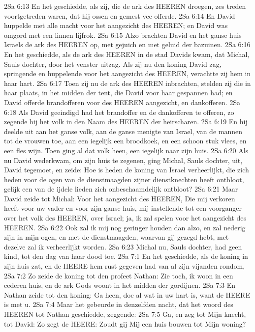 2Sa 6:13  En het geschiedde, als zij, die de ark des HEEREN droegen, zes treden voortgetreden waren, dat hij ossen en gemest vee offerde.
2Sa 6:14  En David huppelde met alle macht voor het aangezicht des HEEREN; en David was omgord met een linnen lijfrok.
2Sa 6:15  Alzo brachten David en het ganse huis Israels de ark des HEEREN op, met gejuich en met geluid der bazuinen.
2Sa 6:16  En het geschiedde, als de ark des HEEREN in de stad Davids kwam, dat Michal, Sauls dochter, door het venster uitzag. Als zij nu den koning David zag, springende en huppelende voor het aangezicht des HEEREN, verachtte zij hem in haar hart.
2Sa 6:17  Toen zij nu de ark des HEEREN inbrachten, stelden zij die in haar plaats, in het midden der tent, die David voor haar gespannen had; en David offerde brandofferen voor des HEEREN aangezicht, en dankofferen.
2Sa 6:18  Als David geeindigd had het brandoffer en de dankofferen te offeren, zo zegende hij het volk in den Naam des HEEREN der heirscharen.
2Sa 6:19  En hij deelde uit aan het ganse volk, aan de ganse menigte van Israel, van de mannen tot de vrouwen toe, aan een iegelijk een broodkoek, en een schoon stuk vlees, en een fles wijn. Toen ging al dat volk heen, een iegelijk naar zijn huis.
2Sa 6:20  Als nu David wederkwam, om zijn huis te zegenen, ging Michal, Sauls dochter, uit, David tegemoet, en zeide: Hoe is heden de koning van Israel verheerlijkt, die zich heden voor de ogen van de dienstmaagden zijner dienstknechten heeft ontbloot, gelijk een van de ijdele lieden zich onbeschaamdelijk ontbloot?
2Sa 6:21  Maar David zeide tot Michal: Voor het aangezicht des HEEREN, Die mij verkoren heeft voor uw vader en voor zijn ganse huis, mij instellende tot een voorganger over het volk des HEEREN, over Israel; ja, ik zal spelen voor het aangezicht des HEEREN.
2Sa 6:22  Ook zal ik mij nog geringer houden dan alzo, en zal nederig zijn in mijn ogen, en met de dienstmaagden, waarvan gij gezegd hebt, met dezelve zal ik verheerlijkt worden.
2Sa 6:23  Michal nu, Sauls dochter, had geen kind, tot den dag van haar dood toe.
2Sa 7:1  En het geschiedde, als de koning in zijn huis zat, en de HEERE hem rust gegeven had van al zijn vijanden rondom,
2Sa 7:2  Zo zeide de koning tot den profeet Nathan: Zie toch, ik woon in een cederen huis, en de ark Gods woont in het midden der gordijnen.
2Sa 7:3  En Nathan zeide tot den koning: Ga heen, doe al wat in uw hart is, want de HEERE is met u.
2Sa 7:4  Maar het gebeurde in denzelfden nacht, dat het woord des HEEREN tot Nathan geschiedde, zeggende:
2Sa 7:5  Ga, en zeg tot Mijn knecht, tot David: Zo zegt de HEERE: Zoudt gij Mij een huis bouwen tot Mijn woning?
